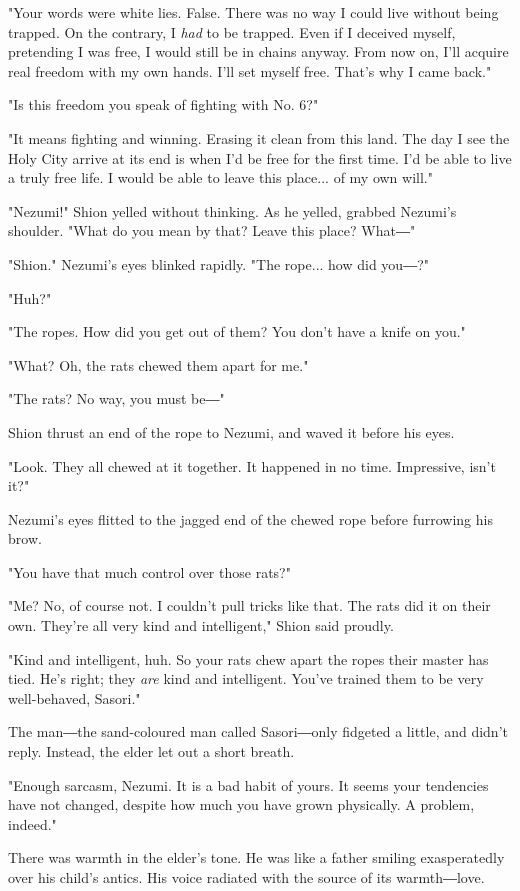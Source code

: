 "Your words were white lies. False. There was no way I could live
without being trapped. On the contrary, I \emph{had} to be trapped. Even if I
deceived myself, pretending I was free, I would still be in chains
anyway. From now on, I'll acquire real freedom with my own hands. I'll
set myself free. That's why I came back."

"Is this freedom you speak of fighting with No. 6?"

"It means fighting and winning. Erasing it clean from this land. The day
I see the Holy City arrive at its end is when I'd be free for the first
time. I'd be able to live a truly free life. I would be able to leave
this place... of my own will."

"Nezumi!" Shion yelled without thinking. As he yelled, grabbed Nezumi's
shoulder. "What do you mean by that? Leave this place? What―"

"Shion." Nezumi's eyes blinked rapidly. "The rope... how did you―?"

"Huh?"

"The ropes. How did you get out of them? You don't have a knife on you."

"What? Oh, the rats chewed them apart for me."

"The rats? No way, you must be―"

Shion thrust an end of the rope to Nezumi, and waved it before his eyes.

"Look. They all chewed at it together. It happened in no time.
Impressive, isn't it?"

Nezumi's eyes flitted to the jagged end of the chewed rope before
furrowing his brow.

"You have that much control over those rats?"

"Me? No, of course not. I couldn't pull tricks like that. The rats did
it on their own. They're all very kind and intelligent," Shion said
proudly.

"Kind and intelligent, huh. So your rats chew apart the ropes their
master has tied. He's right; they \emph{are} kind and intelligent. You've
trained them to be very well-behaved, Sasori."

The man―the sand-coloured man called Sasori―only fidgeted a little, and
didn't reply. Instead, the elder let out a short breath.

"Enough sarcasm, Nezumi. It is a bad habit of yours. It seems your
tendencies have not changed, despite how much you have grown physically.
A problem, indeed."

There was warmth in the elder's tone. He was like a father smiling
exasperatedly over his child's antics. His voice radiated with the
source of its warmth―love.

